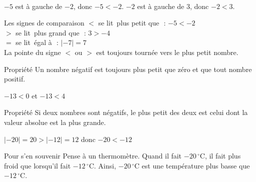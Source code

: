 \begin{center}
\\[6pt]
$-5$ est à gauche de $-2$, donc $-5<-2$. \quad $-2$ est à gauche de $3$, donc $-2<3$.
\end{center}

\vspace{20pt}
\begin{astuce}{Les signes de comparaison}
$<$ se lit \og\,plus petit que\,\fg~: $-5<-2$\\[2pt]
$>$ se lit \og\,plus grand que\,\fg~: $3>-4$\\[2pt]
$=$ se lit \og\,égal à\,\fg~: $\lvert -7\rvert=7$\\[2pt]
La pointe du signe $<$ ou $>$ est toujours tournée vers le \textcolor{themeNO}{plus petit} nombre.
\end{astuce}

\vfill
\begin{regle}{Propriété}
Un nombre \textcolor{themeNO}{négatif} est toujours plus petit que zéro et que tout nombre positif.
\end{regle}

\begin{center}
$-13<0$ \quad\quad et \quad\quad $-13<4$
\end{center}

\vfill
\begin{regle}{Propriété}
Si deux nombres sont négatifs, le plus petit des deux est celui dont la \textcolor{themeNO}{valeur absolue} est la plus grande.
\end{regle}

\begin{center}
$\lvert -20\rvert=20>\lvert -12\rvert=12$ \quad donc \quad $-20<-12$
\end{center}

\vspace{20pt}
\begin{astuce}{Pour s'en souvenir}
Pense à un thermomètre. Quand il fait $-20\,^\circ$C, il fait plus froid que lorsqu'il fait $-12\,^\circ$C. Ainsi, $-20\,^\circ$C est une température plus basse que $-12\,^\circ$C.
\end{astuce}

